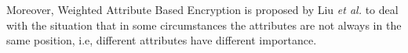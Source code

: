 Moreover, Weighted Attribute Based Encryption is proposed by Liu \emph{et al.} \cite{Ximeng:ICC'14} to deal with the situation that in some circumstances the attributes are not always in the same position, i.e,
different attributes have different importance.

